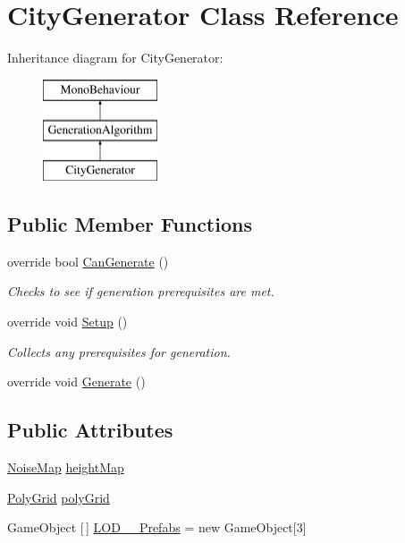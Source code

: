 \hypertarget{class_city_generator}{}\section{City\+Generator Class Reference}
\label{class_city_generator}
Inheritance diagram for City\+Generator\+:\begin{figure}[H]
\begin{center}
\leavevmode
\includegraphics[height=3.000000cm]{class_city_generator}
\end{center}
\end{figure}
\subsection*{Public Member Functions}
\begin{DoxyCompactItemize}
\item 
override bool \mbox{\hyperlink{class_city_generator_abae83261cf4eea2ed07339b644ed13af}{Can\+Generate}} ()
\begin{DoxyCompactList}\small\item\em Checks to see if generation prerequisites are met. \end{DoxyCompactList}\item 
override void \mbox{\hyperlink{class_city_generator_a1b17b4a2ea1d8a4cc1b320829da286ae}{Setup}} ()
\begin{DoxyCompactList}\small\item\em Collects any prerequisites for generation. \end{DoxyCompactList}\item 
override void \mbox{\hyperlink{class_city_generator_aa80ad8d8d723fd17f6bf9a4fe89dec4f}{Generate}} ()
\end{DoxyCompactItemize}
\subsection*{Public Attributes}
\begin{DoxyCompactItemize}
\item 
\mbox{\hyperlink{class_noise_map}{Noise\+Map}} \mbox{\hyperlink{class_city_generator_a41f981122cd74ff6758e7b4dda236085}{height\+Map}}
\item 
\mbox{\hyperlink{class_poly_grid}{Poly\+Grid}} \mbox{\hyperlink{class_city_generator_a9c2dcf98212de701d637f3f3d39214c9}{poly\+Grid}}
\item 
Game\+Object \mbox{[}$\,$\mbox{]} \mbox{\hyperlink{class_city_generator_aa3865cc4ee840dc1d72701093efa4c24}{L\+O\+D\+\_\+\_\+\+Prefabs}} = new Game\+Object\mbox{[}3\mbox{]}
\end{DoxyCompactItemize}


